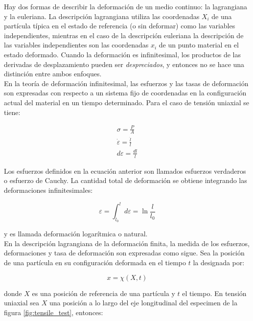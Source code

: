 Hay dos formas de describir la deformación de un medio continuo: la lagrangiana y la euleriana. 
La descripción lagrangiana utiliza las coordenadas $X_i$ de una partícula típica en el estado 
de referencia (o sin deformar) como las variables independientes, mientras en el caso 
de la descripción euleriana la descripción de las variables independientes son las coordenadas 
$x_i$ de un punto material en el estado deformado. Cuando la deformación es infinitesimal, los 
productos de las derivadas de desplazamiento pueden ser \textit{despreciados}, y entonces no 
se hace una distinción entre ambos enfoques. ~\cite{kobayashi1989} \\

En la teoría de deformación infinitesimal, las esfuerzos y las tasas de deformación son expresadas 
con respecto a un sistema fijo de coordenadas en la configuración actual del material en 
un tiempo determinado. Para el caso de tensión uniaxial se tiene: ~\cite{kobayashi1989}

\begin{align}
\sigma = \frac{P}{A} \\
\dot{\varepsilon} = \frac{\dot{l}}{l} \\
d\varepsilon = \frac{dl}{l}
\end{align}

Los esfuerzos definidos en la ecuación anterior son llamados esfuerzos verdaderos o 
esfuerzo de Cauchy. La cantidad total de deformación se obtiene integrando las deformaciones 
infinitesimales:

\begin{equation}
\varepsilon = \int_{l_0}^{l} d\varepsilon = \ln{\frac{l}{l_0}}
\end{equation}

y es llamada deformación logarítmica o natural.\\

En la descripción lagrangiana de la deformación finita, la medida de los esfuerzos, 
deformaciones y tasa de deformación son expresadas como sigue. Sea la posición 
de una partícula en su configuración deformada en el tiempo $t$ la designada por: 

\begin{equation}
x = \chi(X,t)
\end{equation}

donde $X$ es una posición de referencia de una partícula y $t$ el tiempo. En 
tensión uniaxial sea $X$ una posición a lo largo del eje longitudinal del 
especimen de la figura \ref{fig:tensile_test}, entonces:

